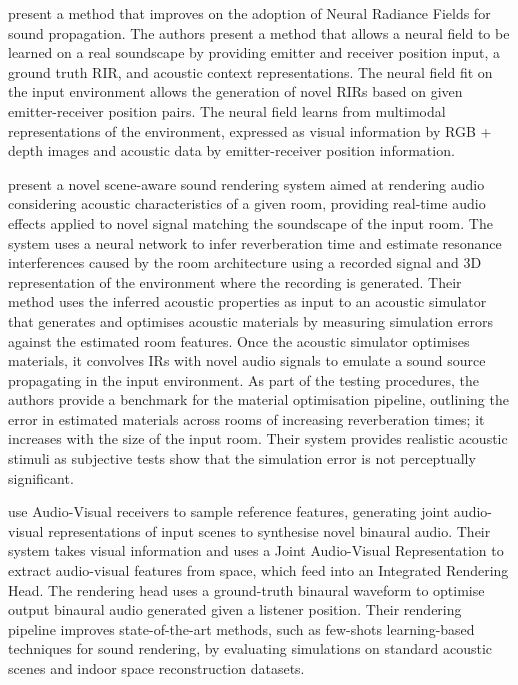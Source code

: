 \cite{liang2023neural} present a method that improves on the adoption of Neural Radiance Fields for sound propagation. The authors present a method that allows a neural field to be learned on a real soundscape by providing emitter and receiver position input, a ground truth RIR, and acoustic context representations. The neural field fit on the input environment allows the generation of novel RIRs based on given emitter-receiver position pairs. The neural field learns from multimodal representations of the environment, expressed as visual information by RGB + depth images and acoustic data by emitter-receiver position information.\par

\cite{tang2020scene} present a novel scene-aware sound rendering system aimed at rendering audio considering acoustic characteristics of a given room, providing real-time audio effects applied to novel signal matching the soundscape of the input room. The system uses a neural network to infer reverberation time and estimate resonance interferences caused by the room architecture using a recorded signal and 3D representation of the environment where the recording is generated. Their method uses the inferred acoustic properties as input to an acoustic simulator that generates and optimises acoustic materials by measuring simulation errors against the estimated room features. Once the acoustic simulator optimises materials, it convolves IRs with novel audio signals to emulate a sound source propagating in the input environment. As part of the testing procedures, the authors provide a benchmark for the material optimisation pipeline, outlining the error in estimated materials across rooms of increasing reverberation times; it increases with the size of the input room. Their system provides realistic acoustic stimuli as subjective tests show that the simulation error is not perceptually significant.\par

\cite{chen2023everywhere} use Audio-Visual receivers to sample reference features, generating joint audio-visual representations of input scenes to synthesise novel binaural audio. Their system takes visual information and uses a Joint Audio-Visual Representation to extract audio-visual features from space, which feed into an Integrated Rendering Head. The rendering head uses a ground-truth binaural waveform to optimise output binaural audio generated given a listener position. Their rendering pipeline improves state-of-the-art methods, such as few-shots learning-based techniques for sound rendering, by evaluating simulations on standard acoustic scenes and indoor space reconstruction datasets.\par

